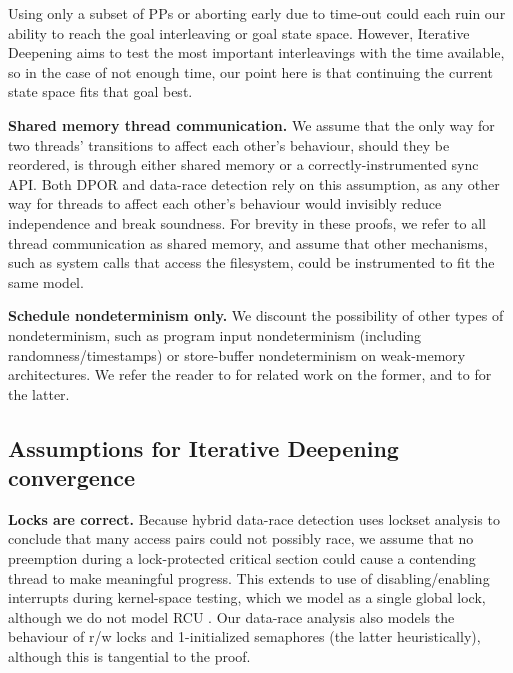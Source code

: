 \documentclass[pldi]{sigplanconf-pldi15}
\begin{document}
Using only a subset of PPs or aborting early due to time-out could each ruin our ability to reach the goal interleaving or goal state space.
However, Iterative Deepening aims to test the most important interleavings with the time available,
so in the case of not enough time, our point here is that continuing the current state space fits that goal best.


{\bf Shared memory thread communication.}
We assume that the only way for two threads' transitions to affect each other's behaviour, should they be reordered,
is through either shared memory or a correctly-instrumented sync API.
Both DPOR and data-race detection rely on this assumption,
as any other way for threads to affect each other's behaviour would invisibly reduce independence and break soundness.
For brevity in these proofs, we refer to all thread communication as shared memory,
and assume that other mechanisms, such as system calls that access the filesystem, could be instrumented to fit the same model.

{\bf Schedule nondeterminism only.}
We discount the possibility of other types of nondeterminism,
such as program input nondeterminism (including randomness/timestamps) or
store-buffer nondeterminism on weak-memory architectures.
We refer the reader to \cite{klee,portend} for related work on the former, and to \cite{tsopso} for the latter.

\subsection{Assumptions for Iterative Deepening convergence}

{\bf Locks are correct.}
Because hybrid data-race detection uses lockset analysis to conclude that many access pairs could not possibly race,
we assume that no preemption during a lock-protected critical section could cause a contending thread to make meaningful progress.
This extends to use of disabling/enabling interrupts during kernel-space testing, which we model as a single global lock,
although we do not model RCU \cite{rcu}.
Our data-race analysis also models the behaviour of r/w locks and 1-initialized semaphores (the latter heuristically), although this is tangential to the proof.
\end{document}
